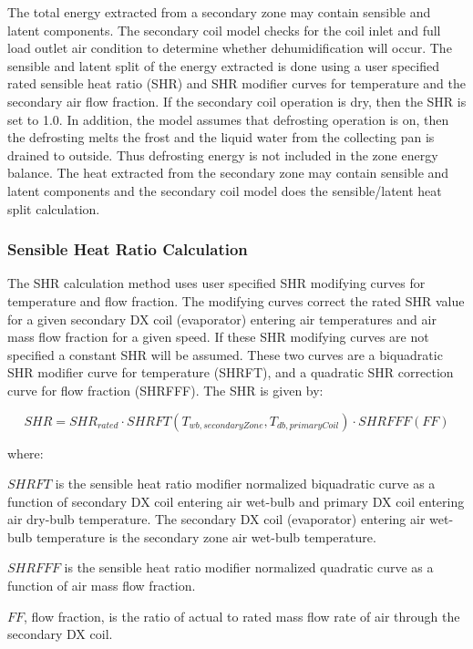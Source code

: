 The total energy extracted from a secondary zone may contain sensible and latent components. The secondary coil model checks for the coil inlet and full load outlet air condition to determine whether dehumidification will occur. The sensible and latent split of the energy extracted is done using a user specified rated sensible heat ratio (SHR) and SHR modifier curves for temperature and the secondary air flow fraction. If the secondary coil operation is dry, then the SHR is set to 1.0. In addition, the model assumes that defrosting operation is on, then the defrosting melts the frost and the liquid water from the collecting pan is drained to outside. Thus defrosting energy is not included in the zone energy balance. The heat extracted from the secondary zone may contain sensible and latent components and the secondary coil model does the sensible/latent heat split calculation.

\subsubsection{Sensible Heat Ratio Calculation}\label{sensible-heat-ratio-calculation}

The SHR calculation method uses user specified SHR modifying curves for temperature and flow fraction. The modifying curves correct the rated SHR value for a given secondary DX coil (evaporator) entering air temperatures and air mass flow fraction for a given speed. If these SHR modifying curves are not specified a constant SHR will be assumed. These two curves are a biquadratic SHR modifier curve for temperature (SHRFT), and a quadratic SHR correction curve for flow fraction (SHRFFF). The SHR is given by:

\begin{equation}
SHR = SHR_{rated}\cdot SHRFT\left(T_{wb,secondaryZone},T_{db,primaryCoil}\right)\cdot SHRFFF(FF)
\end{equation}

where:

\(SHRFT\) is the sensible heat ratio modifier normalized biquadratic curve as a function of secondary DX coil entering air wet-bulb and primary DX coil entering air dry-bulb temperature. The secondary DX coil (evaporator) entering air wet-bulb temperature is the secondary zone air wet-bulb temperature.

\(SHRFFF\) is the sensible heat ratio modifier normalized quadratic curve as a function of air mass flow fraction.

\(FF\), flow fraction,  is the ratio of actual to rated mass flow rate of air through the secondary DX coil.

